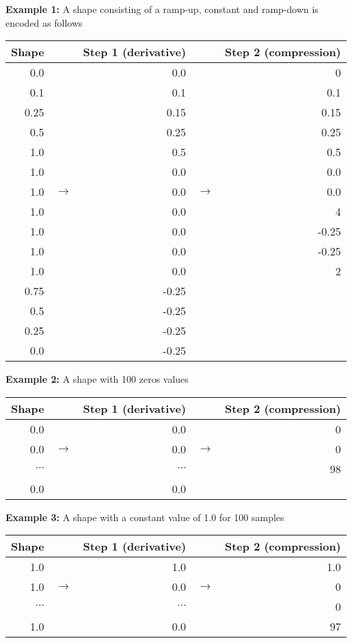 \documentclass{article}
\begin{document}
\textbf{Example 1: } A shape consisting of a ramp-up, constant and ramp-down is encoded as follows
\vspace{-1em}
\begin{center}
\begin{tabular}{rrrrr}
\toprule
Shape & & Step 1 (derivative) && Step 2 (compression) \\
\midrule
0.0 && 0.0 && 0 \\
0.1 && 0.1 && 0.1 \\
0.25&& 0.15&& 0.15 \\
0.5 && 0.25&& 0.25 \\
1.0 && 0.5 && 0.5 \\
1.0 && 0.0 && 0.0 \\
1.0 & $\rightarrow$& 0.0 & $\rightarrow$ & 0.0 \\
1.0 && 0.0 && 4 \\
1.0 && 0.0 && -0.25 \\
1.0 && 0.0 && -0.25 \\
1.0 && 0.0 && 2 \\
0.75&& -0.25 \\
0.5 && -0.25 \\
0.25&& -0.25 \\
0.0 && -0.25 \\
\bottomrule
\end{tabular}
\end{center}

\textbf{Example 2: } A shape with 100 zeros values
\vspace{-1em}
\begin{center}
\begin{tabular}{rrrrr}
\toprule
Shape & & Step 1 (derivative) && Step 2 (compression) \\
\midrule
0.0 && 0.0 && 0 \\
0.0 & $\rightarrow$ & 0.0 & $\rightarrow$ & 0 \\
$\cdots$ &  & $\cdots$ &  & 98 \\
0.0 && 0.0 &&  \\
\bottomrule
\end{tabular}
\end{center}

\textbf{Example 3: } A shape with a constant value of 1.0 for 100 samples
\vspace{-1em}
\begin{center}
\begin{tabular}{rrrrr}
\toprule
Shape & & Step 1 (derivative) && Step 2 (compression) \\
\midrule
1.0 && 1.0 && 1.0 \\
1.0 & $\rightarrow$ & 0.0 & $\rightarrow$ & 0 \\
$\cdots$ &  & $\cdots$  &  & 0 \\
1.0 && 0.0 &&  97 \\
\bottomrule
\end{tabular}
\end{center}
\end{document}
